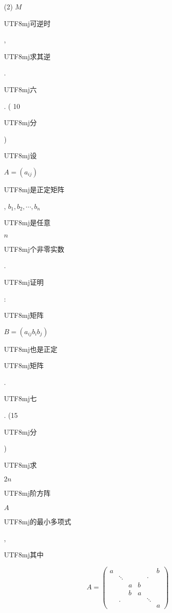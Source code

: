 \documentclass[10pt]{article}
\begin{document}
(2) $M$ \begin{CJK}{UTF8}{mj}可逆时\end{CJK}, \begin{CJK}{UTF8}{mj}求其逆\end{CJK}.

\begin{CJK}{UTF8}{mj}六\end{CJK}. ( 10 \begin{CJK}{UTF8}{mj}分\end{CJK}) \begin{CJK}{UTF8}{mj}设\end{CJK} $A=\left(a_{i j}\right)$ \begin{CJK}{UTF8}{mj}是正定矩阵\end{CJK}, $b_{1}, b_{2}, \cdots, b_{n}$ \begin{CJK}{UTF8}{mj}是任意\end{CJK} $n$ \begin{CJK}{UTF8}{mj}个非零实数\end{CJK}. \begin{CJK}{UTF8}{mj}证明\end{CJK}: \begin{CJK}{UTF8}{mj}矩阵\end{CJK} $B=\left(a_{i j} b_{i} b_{j}\right)$ \begin{CJK}{UTF8}{mj}也是正定\end{CJK} \begin{CJK}{UTF8}{mj}矩阵\end{CJK}. \begin{CJK}{UTF8}{mj}七\end{CJK}. (15 \begin{CJK}{UTF8}{mj}分\end{CJK}) \begin{CJK}{UTF8}{mj}求\end{CJK} $2 n$ \begin{CJK}{UTF8}{mj}阶方阵\end{CJK} $A$ \begin{CJK}{UTF8}{mj}的最小多项式\end{CJK}, \begin{CJK}{UTF8}{mj}其中\end{CJK}
$$
A=\left(\begin{array}{cccccc}
a & & & & & b \\
& \ddots & & & \cdot & \\
& & a & b & & \\
& & b & a & & \\
& . & & & \ddots & \\
& & & & & a
\end{array}\right)
$$
\end{document}
